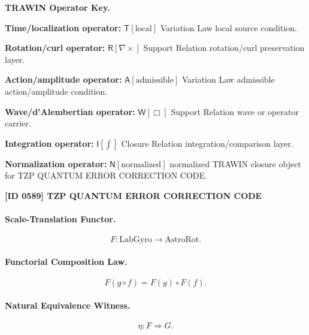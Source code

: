 \par\vspace{0.45\baselineskip}
\noindent\begin{minipage}[t]{\linewidth}
\begingroup
\small
\raggedright
\textbf{TRAWIN Operator Key.}\par
\noindent\textbf{Time/localization operator:} $\mathsf{T}\!\left[\mathrm{local}\right]$ Variation Law local source condition.\par
\noindent\textbf{Rotation/curl operator:} $\mathsf{R}\!\left[\nabla\times\right]$ Support Relation rotation/curl preservation layer.\par
\noindent\textbf{Action/amplitude operator:} $\mathsf{A}\!\left[\mathrm{admissible}\right]$ Variation Law admissible action/amplitude condition.\par
\noindent\textbf{Wave/d'Alembertian operator:} $\mathsf{W}\!\left[\Box\right]$ Support Relation wave or operator carrier.\par
\noindent\textbf{Integration operator:} $\mathsf{I}\!\left[\int\right]$ Closure Relation integration/comparison layer.\par
\noindent\textbf{Normalization operator:} $\mathsf{N}\!\left[\mathrm{normalized}\right]$ normalized TRAWIN closure object for TZP QUANTUM ERROR CORRECTION CODE.\par
\endgroup
\end{minipage}

\clearpage
\noindent\textbf{[ID 0589] TZP QUANTUM ERROR CORRECTION CODE}\par
\vspace{0.35em}
\paragraph{Scale-Translation Functor.}
\begin{equation}
F:\mathrm{LabGyro}\longrightarrow\mathrm{AstroRot}.
\end{equation}

\paragraph{Functorial Composition Law.}
\begin{equation}
F(g\circ f)
=
F(g)\circ F(f).
\end{equation}

\paragraph{Natural Equivalence Witness.}
\begin{equation}
\eta:F\Rightarrow G .
\end{equation}

